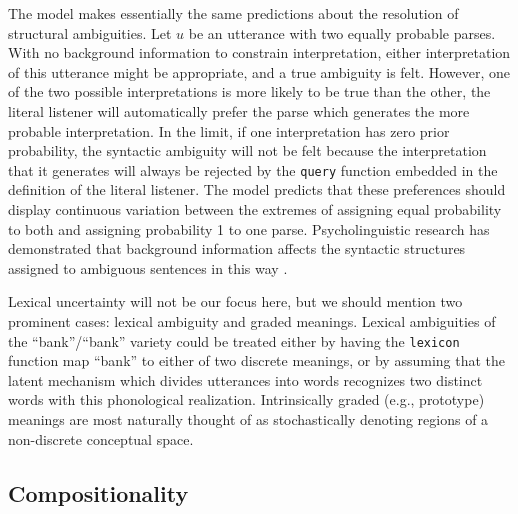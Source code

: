 \documentclass[12pt]{article}
\begin{document}
The model makes essentially the same predictions about the resolution of structural ambiguities. Let $u$ be an utterance with two equally probable parses.
With no background information to constrain interpretation, either interpretation of this utterance might be appropriate, and a true ambiguity is felt. 
However, one of the two possible interpretations is more likely to be true than the other, the literal listener will automatically prefer the parse which generates the more probable interpretation.
In the limit, if one interpretation has zero prior probability, the syntactic ambiguity will not be felt because the interpretation that it generates will always be rejected by the \lstinline{query} function embedded in the definition of the literal listener.
The model predicts that these preferences should display continuous variation between the extremes of assigning equal probability to both and assigning probability 1 to one parse.
Psycholinguistic research has demonstrated that background information affects the syntactic structures assigned to ambiguous sentences in this way \citep{crainsteedman85,altmannsteedman88,spiveyetal02}.

Lexical uncertainty will not be our focus here, but we should mention two prominent cases: lexical ambiguity and graded meanings. 
Lexical ambiguities of the ``bank''/``bank'' variety could be treated either by having the \lstinline{lexicon} function map ``bank'' to either of two discrete meanings, or by assuming that the latent mechanism which divides utterances into words recognizes two distinct words with this phonological realization.
Intrinsically graded (e.g., prototype) meanings are most naturally thought of as stochastically denoting regions of a non-discrete conceptual space. 


\subsection{Compositionality}

\end{document}
